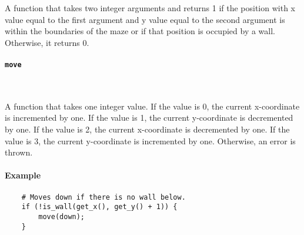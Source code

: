 A function that takes two integer arguments and returns 1 if the position with x value equal to the first argument and y value equal to the second argument is within the boundaries of the maze or if that position is occupied by a wall. Otherwise, it returns 0.

\paragraph{\texttt{move}} \

A function that takes one integer value. If the value is 0, the current x-coordinate is incremented by one. If the value is 1, the current y-coordinate is decremented by one. If the value is 2, the current x-coordinate is decremented by one. If the value is 3, the current y-coordinate is incremented by one. Otherwise, an error is thrown.

\paragraph{Example}

\begin{verbatim}
    # Moves down if there is no wall below.
    if (!is_wall(get_x(), get_y() + 1)) {
        move(down);
    }
\end{verbatim}

